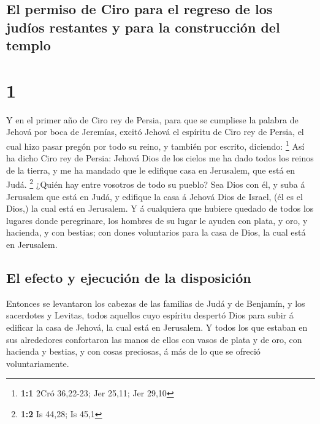 \hypertarget{el-permiso-de-ciro-para-el-regreso-de-los-juduxedos-restantes-y-para-la-construcciuxf3n-del-templo}{%
\subsection{El permiso de Ciro para el regreso de los judíos restantes y
para la construcción del
templo}\label{el-permiso-de-ciro-para-el-regreso-de-los-juduxedos-restantes-y-para-la-construcciuxf3n-del-templo}}

\hypertarget{section}{%
\section{1}\label{section}}

 Y en el primer año de Ciro rey de Persia, para que se
cumpliese la palabra de Jehová por boca de Jeremías, excitó Jehová el
espíritu de Ciro rey de Persia, el cual hizo pasar pregón por todo su
reino, y también por escrito, diciendo: \footnote{\textbf{1:1} 2Cró
  36,22-23; Jer 25,11; Jer 29,10}  Así ha dicho Ciro rey de
Persia: Jehová Dios de los cielos me ha dado todos los reinos de la
tierra, y me ha mandado que le edifique casa en Jerusalem, que está en
Judá. \footnote{\textbf{1:2} Is 44,28; Is 45,1}  ¿Quién hay
entre vosotros de todo su pueblo? Sea Dios con él, y suba á Jerusalem
que está en Judá, y edifique la casa á Jehová Dios de Israel, (él es el
Dios,) la cual está en Jerusalem.  Y á cualquiera que
hubiere quedado de todos los lugares donde peregrinare, los hombres de
su lugar le ayuden con plata, y oro, y hacienda, y con bestias; con
dones voluntarios para la casa de Dios, la cual está en Jerusalem.

\hypertarget{el-efecto-y-ejecuciuxf3n-de-la-disposiciuxf3n}{%
\subsection{El efecto y ejecución de la
disposición}\label{el-efecto-y-ejecuciuxf3n-de-la-disposiciuxf3n}}

 Entonces se levantaron los cabezas de las familias de Judá
y de Benjamín, y los sacerdotes y Levitas, todos aquellos cuyo espíritu
despertó Dios para subir á edificar la casa de Jehová, la cual está en
Jerusalem.  Y todos los que estaban en sus alrededores
confortaron las manos de ellos con vasos de plata y de oro, con hacienda
y bestias, y con cosas preciosas, á más de lo que se ofreció
voluntariamente.

